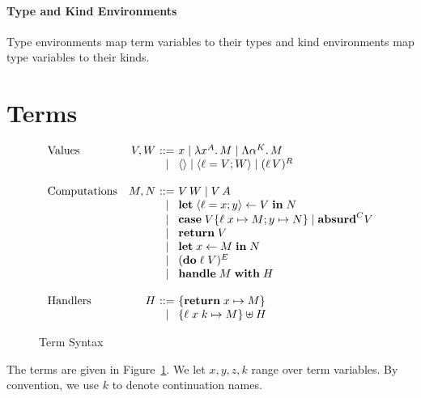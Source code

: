 \documentclass[12pt,mscres,cdtppar,twoside,openright,logo,rightchapter,normalheadings]{infthesis}
\makeatletter
\theoremstyle{definition}
\newcommand{\slab}[1]{\textrm{#1}}
\newcommand{\revto}{\ensuremath{\leftarrow}}
\newcommand{\keyw}[1]{\textbf{#1}}
\newcommand{\Handle}{\keyw{handle}}
\newcommand{\With}{\keyw{with}}
\newcommand{\Let}{\keyw{let}}
\newcommand{\In}{\keyw{in}}
\newcommand{\Do}{\keyw{do}}
\newcommand{\Return}{\keyw{return}}
\newcommand{\Case}{\keyw{case}}
\newcommand{\Absurd}{\keyw{absurd}}
\newcommand{\Record}[1]{\ensuremath{\langle #1 \rangle}}
\newcommand{\True}{\mathsf{true}}
\newcommand{\False}{\mathsf{false}}
\newcommand{\ba}{\begin{array}}
\newcommand{\ea}{\end{array}}
\newenvironment{syntax}{\[\ba{@{}l@{\quad}r@{~}c@{~}l@{}}}{\ea\]\ignorespacesafterend}
\makeatother
\begin{document}
\paragraph{Type and Kind Environments}
Type environments map term variables to their types and kind
environments map type variables to their kinds.

\section{Terms}
\begin{figure}
\begin{syntax}
\slab{Values}        &V,W  &::= & x
                             \mid \lambda x^A .\, M \mid \Lambda \alpha^K .\, M  \\
                     &     &\mid& \Record{} \mid \Record{\ell = V;W} \mid (\ell\, V)^R \\
                     &     &    &\\
\slab{Computations}  &M,N  &::= & V\,W \mid V\,A\\
                     &     &\mid& \Let\; \Record{\ell=x;y} \revto V \; \In \; N\\
                     &     &\mid& \Case\; V \{\ell\; x \mapsto M; y \mapsto N\} \mid \Absurd^C V\\
                     &     &\mid& \Return\; V \\
                     &     &\mid& \Let \; x \revto M \; \In \; N\\
                     &     &\mid& (\Do \; \ell \; V)^E \\
                     &     &\mid& \Handle \; M \; \With \; H\\
                     &     &    &\\
\slab{Handlers}      &H    &::= & \{ \Return \; x \mapsto M \} \\
                     &     &\mid& \{ \ell \; x \; k \mapsto M \} \uplus H \\
\end{syntax}

\caption{Term Syntax}
\label{fig:term-syntax}
\end{figure}
The terms are given in Figure~\ref{fig:term-syntax}. We let $x,y,z,k$
range over term variables. By convention, we use $k$ to denote
continuation names. %
\end{document}
